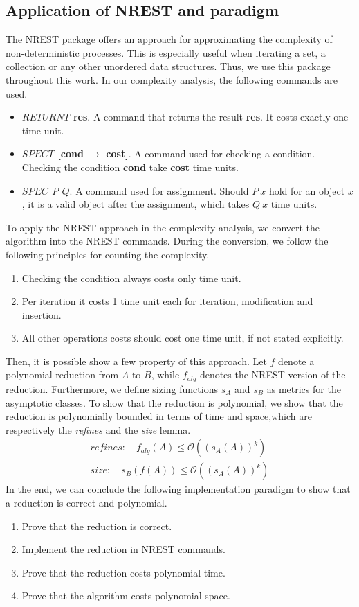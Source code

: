 \subsection{Application of NREST and paradigm}
The NREST package offers an approach for approximating the complexity of non-deterministic processes.
This is especially useful when iterating a set, a collection or any other unordered data structures. Thus,
we use this package throughout this work. In our complexity analysis, the following commands are used. 
\begin{itemize}
    \item \textbf{$RETURNT$ res}. A command that returns the result \textbf{res}. It costs exactly one time unit.
    \item \textbf{$SPECT$ [cond $\rightarrow$ cost]}. A command used for checking a condition. Checking the condition \textbf{cond}
    take \textbf{cost} time units.
    \item \textbf{$SPEC$ $P$ $Q$}. A command used for assignment. Should $P\ x$ hold for an object $x$, it is a valid object after the assignment,
    which takes $Q\ x$ time units.
\end{itemize}
To apply the NREST approach in the complexity analysis, we convert the algorithm into the NREST commands.
During the conversion, we follow the following principles for counting the complexity.
\begin{enumerate}
    \item Checking the condition always costs only time unit. 
    \item Per iteration it costs 1 time unit each for iteration, modification and insertion.
    \item All other operations costs should cost one time unit, if not stated explicitly.
\end{enumerate}
Then, it is possible show a few property of this approach. 
Let $f$ denote a polynomial reduction from $A$ to $B$, while $f_{alg}$ denotes the NREST version of the reduction.
Furthermore, we define sizing functions $s_A$ and $s_B$ as metrics for the asymptotic classes.
To show that the reduction is polynomial, we show that the reduction is polynomially bounded in terms 
of time and space,which are respectively the \textit{refines} and the \textit{size} lemma.
\begin{align}
    refines: \quad f_{alg}(A) \leq \mathcal{O}((s_A(A))^k) \\
    size: \quad s_B (f(A)) \leq \mathcal{O}((s_A(A))^k)
\end{align}
In the end, we can conclude the following implementation paradigm to show that a reduction is correct and polynomial.
\begin{enumerate}
    \item Prove that the reduction is correct.
    \item Implement the reduction in NREST commands.
    \item Prove that the reduction costs polynomial time.
    \item Prove that the algorithm costs polynomial space.
\end{enumerate}
